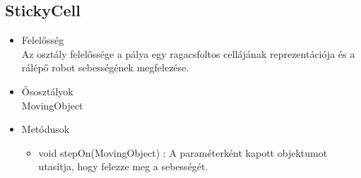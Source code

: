 \subsection{StickyCell}
\begin{itemize}
	\item Felelősség\\
	Az osztály felelőssége a pálya egy ragacsfoltos cellájának reprezentációja és a rálépő robot sebességének megfelezése.
	\item Ősosztályok\\
	MovingObject
	\item Metódusok
	\begin{itemize}
		\item void stepOn(MovingObject) : A paraméterként kapott objektumot utasítja, hogy felezze meg a sebességét.
	\end{itemize}
\end{itemize}
